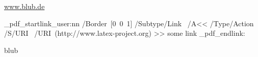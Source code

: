 \documentclass{article}
\begin{document}
\url{www.blub.de}

\leavevmode
\ExplSyntaxOn
\driver_pdf_startlink_user:nn
 {
  /Border~[0~0~1]
 }
 {
  /Subtype/Link~
       /A<<
         /Type/Action~
         /S/URI~
         /URI~(http://www.latex-project.org)%
       >>
 }
  some link
\driver_pdf_endlink:
\ExplSyntaxOff

blub
\end{document}

